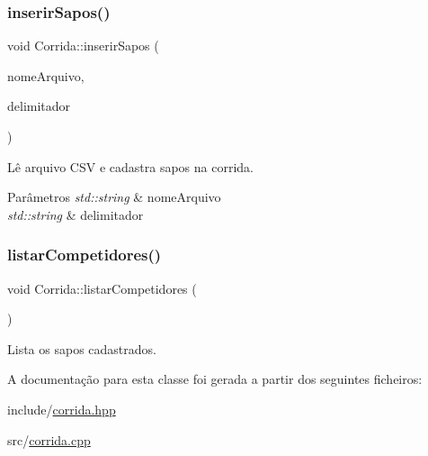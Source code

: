 \subsubsection{\texorpdfstring{inserir\+Sapos()}{inserirSapos()}}
{\footnotesize\ttfamily void Corrida\+::inserir\+Sapos (\begin{DoxyParamCaption}\item[{std\+::string}]{nome\+Arquivo,  }\item[{std\+::string}]{delimitador }\end{DoxyParamCaption})}



Lê arquivo C\+SV e cadastra sapos na corrida. 


\begin{DoxyParams}{Parâmetros}
{\em std\+::string} & nome\+Arquivo \\
\hline
{\em std\+::string} & delimitador \\
\hline
\end{DoxyParams}
\mbox{\label{classCorrida_a57cf1caa60f1dbcdc8a144cbe8cdc525}} 
\subsubsection{\texorpdfstring{listar\+Competidores()}{listarCompetidores()}}
{\footnotesize\ttfamily void Corrida\+::listar\+Competidores (\begin{DoxyParamCaption}{ }\end{DoxyParamCaption})}



Lista os sapos cadastrados. 



A documentação para esta classe foi gerada a partir dos seguintes ficheiros\+:\begin{DoxyCompactItemize}
\item 
include/\hyperlink{corrida_8hpp}{corrida.\+hpp}\item 
src/\hyperlink{corrida_8cpp}{corrida.\+cpp}\end{DoxyCompactItemize}
